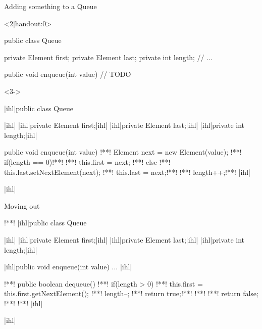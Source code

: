 \begin{frame}[c,fragile]{Adding something to a Queue}
\SetupLstHl
\begin{onlyenv}<2|handout:0>
\begin{plainjava}
public class Queue {
    private Element first;
    private Element last;
    private int length;
    // ...

    public void enqueue(int value) {
        // TODO
    }
}
\end{plainjava}
\end{onlyenv}
\begin{onlyenv}<3->
    \begin{plainjava}
|ihl|public class Queue {|ihl|
    |ihl|private Element first;|ihl|
    |ihl|private Element last;|ihl|
    |ihl|private int length;|ihl|

    public void enqueue(int value) {
!**!        Element next = new Element(value);
!**!        if(length == 0)!**!
!**!            this.first = next;
!**!        else
!**!            this.last.setNextElement(next);
!**!        this.last = next;!**!
!**!        length++;!**!
    }
|ihl|}|ihl|
\end{plainjava}
\end{onlyenv}
\end{frame}

\begin{frame}[c,fragile]{Moving out}
\SetupLstHl
\begin{plainjava}
!**!
|ihl|public class Queue {|ihl|
    |ihl|private Element first;|ihl|
    |ihl|private Element last;|ihl|
    |ihl|private int length;|ihl|

    |ihl|public void enqueue(int value) { ... }|ihl|

!**!    public boolean dequeue() {
!**!        if(length > 0) {
!**!            this.first = this.first.getNextElement();
!**!            length--;
!**!            return true;!**!
!**!        }
!**!        return false;
!**!    }!**!
|ihl|}|ihl|
\end{plainjava}
\end{frame}

